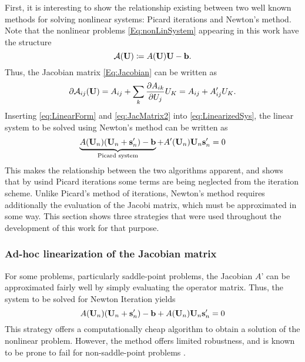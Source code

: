 First, it is interesting to show the relationship existing between two well known methods for solving nonlinear systems: Picard iterations and Newton's method. Note that the nonlinear problems \cref{Eq:nonLinSystem} appearing in this work have the structure
\begin{equation}
	\mathcal{A}(\textbf{U}) \coloneqq  A(\textbf{U})\textbf{U}-\textbf{b}. \label{eq:LinearForm}
\end{equation}
Thus, the Jacobian matrix \cref{Eq:Jacobian} can be written as
\begin{equation}
	\partial \mathcal{A}_{ij}(\textbf{U})  = A_{ij} + \sum_k \frac{\partial A_{ik}}{\partial U_j} U_K = A_{ij} + A'_{ij}U_K.\label{eq:JacMatrix2}
\end{equation}
Inserting \cref{eq:LinearForm} and  \cref{eq:JacMatrix2} into \cref{eq:LinearizedSys}, the linear system to be solved using Newton's method can be written as
\begin{equation}
	\underbrace{A(\textbf{U}_n)(\textbf{U}_n+\textbf{s}'_n) - \textbf{b}}_{\text{Picard system}} + A'(\textbf{U}_n)\textbf{U}_n\textbf{s}'_n = 0 \label{eq:PicardNewtonComp}
\end{equation}
This makes the relationship between the two algorithms apparent, and shows that by usind Picard iterations some terms are being neglected from the iteration scheme. Unlike Picard's method of iterations, Newton's method requires additionally the evaluation of the Jacobi matrix, which must be approximated in some way. This section shows three strategies that were used throughout the development of this work for that purpose.

\subsubsection{Ad-hoc linearization of the Jacobian matrix}
For some problems, particularly saddle-point problems, the Jacobian $A$' can be approximated fairly well by simply evaluating the operator matrix. Thus, the system to be solved for Newton Iteration yields
\begin{equation}
	A(\textbf{U}_n)(\textbf{U}_n+\textbf{s}'_n) - \textbf{b} + A(\textbf{U}_n)\textbf{U}_n\textbf{s}'_n = 0
\end{equation}
This strategy offers a computationally cheap algorithm to obtain a solution of the nonlinear problem. However, the method offers limited robustness, and is known to be prone to fail for non-saddle-point problems \parencite{kikkerHighOrderEXtendedDiscontinuous2020}. 

